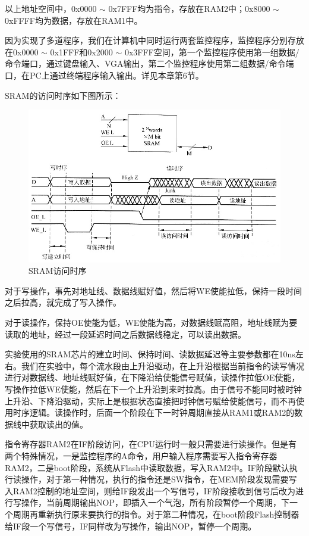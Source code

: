 以上地址空间中，0x0000  $\sim$ 0x7FFF均为指令，存放在RAM2中；0x8000  $\sim$ 0xFFFF均为数据，存放在RAM1中。

因为实现了多道程序，我们在计算机中同时运行两套监控程序，监控程序分别存放在0x0000 $\sim$ 0x1FFF和0x2000 $\sim$ 0x3FFF空间，第一个监控程序使用第一组数据/命令端口，通过键盘输入、VGA输出，第二个监控程序使用第二组数据/命令端口，在PC上通过终端程序输入输出。详见本章第6节。

SRAM的访问时序如下图所示：
\begin{figure}[H]
  \includegraphics[width=\linewidth]{Figures/SRAM.jpg}
  \caption{SRAM访问时序}
\end{figure}

对于写操作，事先对地址线、数据线赋好值，然后将WE使能拉低，保持一段时间之后拉高，就完成了写入操作。

对于读操作，保持OE使能为低，WE使能为高，对数据线赋高阻，地址线赋为要读取的地址，经过一段延迟时间之后数据线稳定，可以读出数据。

实验使用的SRAM芯片的建立时间、保持时间、读数据延迟等主要参数都在10ns左右。我们在实验中，每个流水段由上升沿驱动，在上升沿根据当前指令的读写情况进行对数据线、地址线赋好值，在下降沿给使能信号赋值，读操作拉低OE使能，写操作拉低WE使能，然后在下一个上升沿到来时拉高。由于信号不能同时被时钟上升沿、下降沿驱动，实际上是根据状态直接把时钟信号赋给使能信号，而不再使用时序逻辑。读操作时，后面一个阶段在下一时钟周期直接从RAM1或RAM2的数据线中获取读出的值。

指令寄存器RAM2在IF阶段访问，在CPU运行时一般只需要进行读操作。但是有两个特殊情况，一是监控程序的A命令，用户输入程序需要写入指令寄存器RAM2，二是boot阶段，系统从Flash中读取数据，写入RAM2中。IF阶段默认执行读操作，对于第一种情况，执行的指令还是SW指令，在MEM阶段发现需要写入RAM2控制的地址空间，则给IF段发出一个写信号，IF阶段接收到信号后改为进行写操作，当前周期输出NOP，即插入一个气泡，所有阶段暂停一个周期，下一个周期再重新执行原来要执行的指令。对于第二种情况，在boot阶段Flash控制器给IF段一个写信号，IF同样改为写操作，输出NOP，暂停一个周期。

